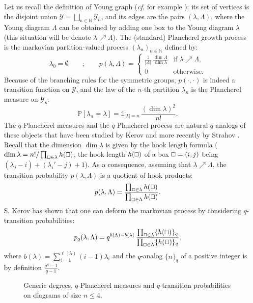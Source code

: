 \documentclass[10pt]{amsart}
\theoremstyle{remark}
\newcommand{\N}{\mathbb{N}}
\newcommand{\young}{\mathscr{Y}}
\newcommand{\proba}{\mathbb{P}}
\newcommand{\figcap}[2]{\begin{figure}[ht] \begin{center} {\footnotesize{#1}} \caption{#2} \end{center} \end{figure}}
\begin{document}
Let us recall the definition of Young graph (\emph{cf.} for example \cite[p. 5]{KOO97}): its set of vertices is the disjoint union $\young=\bigsqcup_{n \in \N} \young_{n}$, and its edges are the pairs $(\lambda,\Lambda)$, where the Young diagram $\Lambda$ can be obtained by adding one box to the Young diagram $\lambda$ (this situation will be denote $\lambda \nearrow \Lambda$). The (standard) Plancherel growth process is the markovian partition-valued process $(\lambda_{n})_{n \in \N}$ defined by:
$$\lambda_{0}=\emptyset\qquad;\qquad p(\lambda,\Lambda)=\begin{cases} \frac{1}{|\Lambda|}\,\frac{\dim \Lambda}{\dim \lambda}& \text{if }\lambda \nearrow \Lambda,\\
0&\text{otherwise}.\end{cases}$$ 
Because of the branching rules for the symmetric groups, $p(\cdot,\cdot)$ is indeed a transition function on $\young$, and the law of the $n$-th partition $\lambda_{n}$ is the Plancherel measure on $\young_{n}$:
$$\proba[\lambda_{n}=\lambda]=\mathbb{1}_{|\lambda|=n}\,\frac{(\dim \lambda)^{2}}{n!}.$$
The $q$-Plancherel measures and the $q$-Plancherel process are natural $q$-analogs
of these objects that have been studied by Kerov \cite{KerovQHookWalk} and more recently
by Strahov \cite{Stra08}. Recall that the dimension $\dim \lambda$ is given by
the hook length formula ($\dim \lambda = n!/\prod_{\oblong \in \lambda} h(\oblong)$,
the hook length $h(\oblong)$ of a box $\oblong=(i,j)$ being $(\lambda_{j}-i)+(\lambda_{i}'-j)+1$).
As a consequence, assuming that $\lambda \nearrow \Lambda$, the transition probability $p(\lambda,\Lambda)$ is a quotient of hook products: $$p(\lambda,\Lambda)=\frac{\prod_{\oblong \in \lambda}h(\oblong) }{ \prod_{\oblong \in \Lambda} h(\oblong)}.$$
S. Kerov has shown that one can deform the markovian process by considering $q$-transition probabilities:
$$p_{q}(\lambda,\Lambda) = q^{b(\Lambda)-b(\lambda)}\,\frac{\prod_{\oblong \in \lambda} \{h(\oblong)\}_{q}}{\prod_{\oblong \in \Lambda} \{h(\oblong)\}_{q}},$$
where $b(\lambda)=\sum_{i=1}^{\ell(\lambda)} (i-1)\lambda_i$ and the $q$-analog $\{n\}_{q}$
of a positive integer is by definition $\frac{q^{n}-1}{q-1}$.
\figcap{}{Generic degrees, $q$-Plancherel measures and $q$-transition probabilities on diagrams of size $n\leq 4$.\label{qplancherelprocess}}
\end{document}
